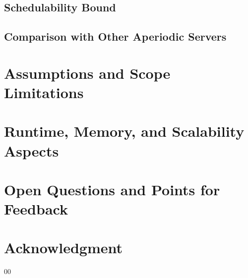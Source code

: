 \documentclass[conference]{IEEEtran}
\begin{document}
\subsection{Schedulability Bound}

\subsection{Comparison with Other Aperiodic Servers}

\section{Assumptions and Scope Limitations}
\section{Runtime, Memory, and Scalability Aspects}
\section{Open Questions and Points for Feedback}

\section*{Acknowledgment}

\begin{thebibliography}{00}
\end{thebibliography}
\end{document}
